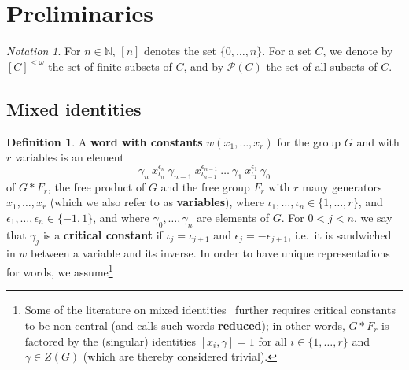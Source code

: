 \documentclass{article}
\theoremstyle{remark}
\newtheorem{notation}[theorem]{Notation}
\theoremstyle{definition}
\newtheorem{definition}[theorem]{Definition}
\begin{document}
{\section{Preliminaries}\label{sect:prelims}

\begin{notation}
{For $n\in\mathbb{N}$, $[n]$ denotes the set $\{0, \dots, n\}$. For a set $C$, we denote by $[C]^{<\omega}$ the set of finite subsets of $C$, and by $\mathcal{P}(C)$ the set of all subsets of $C$.} 
\end{notation}

\subsection{Mixed identities}\label{subsect:mixedidentities}

\begin{definition}\label{def:word} A \textbf{word with constants} $w(x_1, \dots, x_r)$ for the group $G$ and with $r$  variables  is an element
\begin{equation}\label{eq:word}
\gamma_n\ x_{\iota_n}^{\epsilon_n}\ \gamma_{n-1}\  x_{\iota_{n-1}}^{\epsilon_{n-1}}\ \dots\ \gamma_1\ x_{\iota_{1}}^{\epsilon_1}\ \gamma_0 %
\end{equation}
of $G*F_r$, 
the free product of $G$ and the free group $F_r$ with $r$ many generators $x_1,\ldots,x_r$ (which we also refer to as \textbf{variables}), where $\iota_1, \dots, \iota_n\in \{1, \dots, r\}$, and $\epsilon_1, \dots, \epsilon_n\in\{-1, 1\}$, and where $\gamma_0,\ldots,\gamma_n$ are elements of $G$. For $0<j< n$, 
we say that $\gamma_j$ is a \textbf{critical constant} if $\iota_{j}=\iota_{j+1}$ and $\epsilon_j=-\epsilon_{j+1}$, 
i.e.~it is sandwiched in $w$ between a variable and its inverse. In order to have unique representations for words, we assume\footnote{{Some of the literature on mixed identities~\cite{bodirsky2024mixed, bradford2023non, bradford2024length, schneider2024word} further requires critical constants to be non-central (and calls such words \textbf{reduced}); 
in other words, $G*F_r$ is factored by the (singular) identities $[x_i,\gamma]=1$ for all $i\in\{1, \dots, r\}$ and $\gamma\in Z(G)$ (which are thereby considered trivial). 
}}
\end{definition}}
\end{document}
